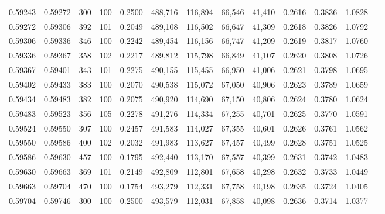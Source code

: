 \begin{tabular}{rrrrrrrrrrrrr}
0.59243 & 0.59272 &   300 & 100 &                                     0.2500 & 488,716 & 116,894 &  66,546 &  41,410 & 0.2616 & 0.3836 & 1.0828 \\
0.59272 & 0.59306 &   392 & 101 &                                     0.2049 & 489,108 & 116,502 &  66,647 &  41,309 & 0.2618 & 0.3826 & 1.0792 \\
0.59306 & 0.59336 &   346 & 100 &                                     0.2242 & 489,454 & 116,156 &  66,747 &  41,209 & 0.2619 & 0.3817 & 1.0760 \\
0.59336 & 0.59367 &   358 & 102 &                                     0.2217 & 489,812 & 115,798 &  66,849 &  41,107 & 0.2620 & 0.3808 & 1.0726 \\
0.59367 & 0.59401 &   343 & 101 &                                     0.2275 & 490,155 & 115,455 &  66,950 &  41,006 & 0.2621 & 0.3798 & 1.0695 \\
0.59402 & 0.59433 &   383 & 100 &                                     0.2070 & 490,538 & 115,072 &  67,050 &  40,906 & 0.2623 & 0.3789 & 1.0659 \\
0.59434 & 0.59483 &   382 & 100 &                                     0.2075 & 490,920 & 114,690 &  67,150 &  40,806 & 0.2624 & 0.3780 & 1.0624 \\
0.59483 & 0.59523 &   356 & 105 &                                     0.2278 & 491,276 & 114,334 &  67,255 &  40,701 & 0.2625 & 0.3770 & 1.0591 \\
0.59524 & 0.59550 &   307 & 100 &                                     0.2457 & 491,583 & 114,027 &  67,355 &  40,601 & 0.2626 & 0.3761 & 1.0562 \\
0.59550 & 0.59586 &   400 & 102 &                                     0.2032 & 491,983 & 113,627 &  67,457 &  40,499 & 0.2628 & 0.3751 & 1.0525 \\
0.59586 & 0.59630 &   457 & 100 &                                     0.1795 & 492,440 & 113,170 &  67,557 &  40,399 & 0.2631 & 0.3742 & 1.0483 \\
0.59630 & 0.59663 &   369 & 101 &                                     0.2149 & 492,809 & 112,801 &  67,658 &  40,298 & 0.2632 & 0.3733 & 1.0449 \\
0.59663 & 0.59704 &   470 & 100 &                                     0.1754 & 493,279 & 112,331 &  67,758 &  40,198 & 0.2635 & 0.3724 & 1.0405 \\
0.59704 & 0.59746 &   300 & 100 &                                     0.2500 & 493,579 & 112,031 &  67,858 &  40,098 & 0.2636 & 0.3714 & 1.0377 \\

\end{tabular}
